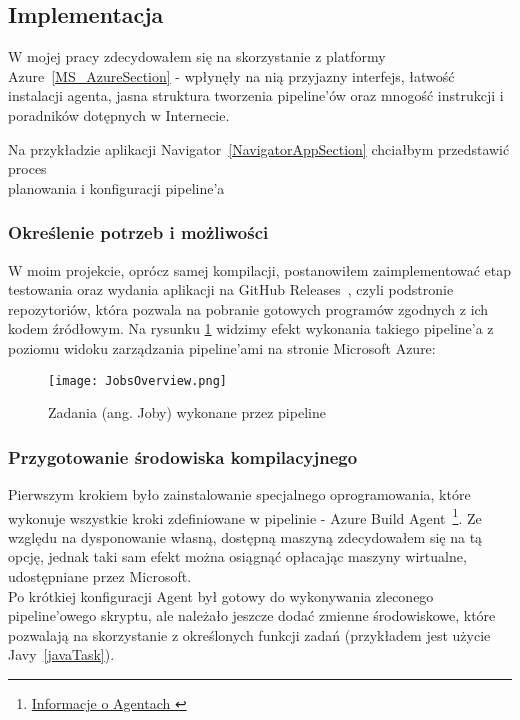 \subsection{Implementacja}
W mojej pracy zdecydowałem się na skorzystanie z platformy Azure~\ref{MS_AzureSection} - 
wpłynęły na nią przyjazny interfejs, łatwość instalacji agenta, jasna struktura tworzenia pipeline'ów 
oraz mnogość instrukcji i poradników dotępnych w Internecie.

Na przykładzie aplikacji Navigator~\ref{NavigatorAppSection} chciałbym przedstawić proces \\
planowania i konfiguracji pipeline'a \todo{}

\subsubsection{Określenie potrzeb i możliwości}
W moim projekcie, oprócz samej kompilacji, postanowiłem zaimplementować etap testowania 
oraz wydania aplikacji na GitHub Releases~\cite{githubReleases}, czyli podstronie repozytoriów, która 
pozwala na pobranie gotowych programów zgodnych z ich kodem źródłowym.
Na rysunku \ref{img:JobsOverview} widzimy efekt wykonania takiego pipeline'a z poziomu 
widoku zarządzania pipeline'ami na stronie Microsoft Azure:

\begin{figure}[ht]
    \centering
    \texttt{[image: JobsOverview.png]}
    \caption{Zadania (ang. Joby) wykonane przez pipeline}
    \label{img:JobsOverview}
\end{figure}


\subsubsection{Przygotowanie środowiska kompilacyjnego}
Pierwszym krokiem było zainstalowanie specjalnego oprogramowania, 
które wykonuje wszystkie kroki zdefiniowane w pipelinie - Azure Build Agent~\footnote[1]{
    \href{https://learn.microsoft.com/en-us/azure/devops/pipelines/agents/agents}{
        Informacje o Agentach
    }
}.
Ze względu na dysponowanie własną, dostępną maszyną zdecydowałem się na tą opcję,
jednak taki sam efekt można osiągnąć opłacając maszyny wirtualne, udostępniane przez Microsoft. \\%
Po krótkiej konfiguracji Agent był gotowy do 
wykonywania zleconego pipeline'owego skryptu, ale należało jeszcze dodać zmienne środowiskowe, 
które pozwalają na skorzystanie z określonych funkcji zadań (przykładem jest użycie Javy~\ref{javaTask}).

